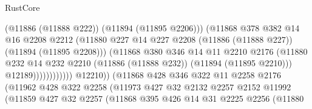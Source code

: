 \begin{lexlean}{RustCore}
\begin{coremodule}
                                            (@11886 (@11888 @222))
                                            (@11894 (@11895 @2206)))
                                          (@11868
                                            @378
                                            @382
                                            @14
                                            @16
                                            @2208
                                            @2212
                                            (@11880
                                              @227
                                              @14
                                              @227
                                              @2208
                                              (@11886 (@11888 @227))
                                              (@11894 (@11895 @2208)))
                                            (@11868
                                              @380
                                              @346
                                              @14
                                              @11
                                              @2210
                                              @2176
                                              (@11880
                                                @232
                                                @14
                                                @232
                                                @2210
                                                (@11886 (@11888 @232))
                                                (@11894 (@11895 @2210)))
                                              @12189))))))))))))
                      @12210))
                  (@11868
                    @428
                    @346
                    @322
                    @11
                    @2258
                    @2176
                    (@11962
                      @428
                      @322
                      @2258
                      (@11973
                        @427
                        @32
                        @2132
                        @2257
                        @2152
                        @11992
                        (@11859
                          @427
                          @32
                          @2257
                          (@11868
                            @395
                            @426
                            @14
                            @31
                            @2225
                            @2256
                            (@11880

\end{coremodule}
\end{lexlean}
